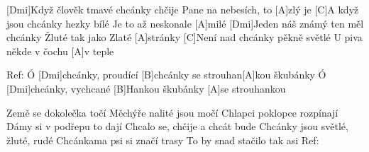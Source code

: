 
[Dmi]Když člověk tmavé chcánky chčije
Pane na nebesích, to [A]zlý je
[C]A když jsou chcánky hezky bílé
Je to až neskonale [A]milé
[Dmi]Jeden náš známý ten měl chcánky
Žluté tak jako Zlaté [A]stránky
[C]Není nad chcánky pěkně světlé
U piva někde v čochu [A]v teple

Ref:
Ó [Dmi]chcánky, proudící [B]chcánky
se strouhan[A]kou škubánky
Ó [Dmi]chcánky, vychcané [B]Hankou
škubánky [A]se strouhankou

Země se dokolečka točí
Měchýře nalité jsou močí
Chlapci poklopce rozpínají
Dámy si v podřepu to dají
Chcalo se, chčije a chcát bude
Chcánky jsou světlé, žluté, rudé
Chcánkama psi si značí trasy
To by snad stačilo tak asi
Ref:
